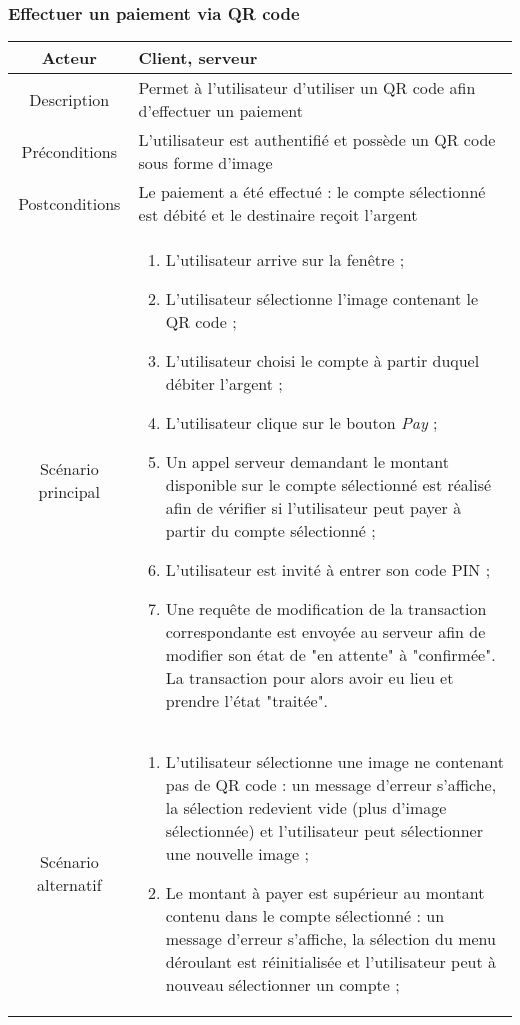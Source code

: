 \documentclass{article}
\begin{document}
\newpage


\subsubsection{Effectuer un paiement via QR code}
\begin{table}[h!]

\begin{tabular}{|c|p{11cm}|}
\hline
Acteur & Client, serveur \\
\hline
Description & Permet à l'utilisateur d'utiliser un QR code afin d'effectuer un paiement \\
\hline
Préconditions & L'utilisateur est authentifié et possède un QR code sous forme d'image \\
\hline
Postconditions & Le paiement a été effectué : le compte sélectionné est débité et le destinaire reçoit l'argent \\
\hline
Scénario principal & \begin{enumerate}
\item L'utilisateur arrive sur la fenêtre ;
\item L'utilisateur sélectionne l'image contenant le QR code ;
\item L'utilisateur choisi le compte à partir duquel débiter l'argent ;
\item L'utilisateur clique sur le bouton \emph{Pay} ;
\item Un appel serveur demandant le montant disponible sur le compte sélectionné est réalisé afin de vérifier si l'utilisateur peut payer à partir du compte sélectionné ;
\item L'utilisateur est invité à entrer son code PIN ;
\item Une requête de modification de la transaction correspondante est envoyée au serveur afin de modifier son état de "en attente" à "confirmée". La transaction pour alors avoir eu lieu et prendre l'état "traitée".
\end{enumerate} \\
\hline
Scénario alternatif & \begin{enumerate}
\item L'utilisateur sélectionne une image ne contenant pas de QR code : un message d'erreur s'affiche, la sélection redevient vide (plus d'image sélectionnée) et l'utilisateur peut sélectionner une nouvelle image ;
\item Le montant à payer est supérieur au montant contenu dans le compte sélectionné : un message d'erreur s'affiche, la sélection du menu déroulant est réinitialisée et l'utilisateur peut à nouveau sélectionner un compte ;

\end{enumerate}
\end{tabular}
\end{table}
\end{document}
